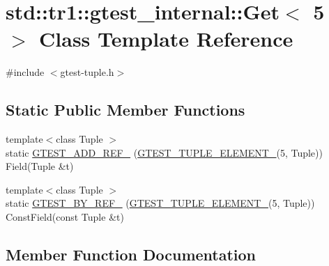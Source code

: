 \hypertarget{classstd_1_1tr1_1_1gtest__internal_1_1_get_3_015_01_4}{}\section{std\+:\+:tr1\+:\+:gtest\+\_\+internal\+:\+:Get$<$ 5 $>$ Class Template Reference}
\label{classstd_1_1tr1_1_1gtest__internal_1_1_get_3_015_01_4}


{\ttfamily \#include $<$gtest-\/tuple.\+h$>$}

\subsection*{Static Public Member Functions}
\begin{DoxyCompactItemize}
\item 
{\footnotesize template$<$class Tuple $>$ }\\static \hyperlink{classstd_1_1tr1_1_1gtest__internal_1_1_get_3_015_01_4_a0a337088bab3f824f67d1607229fdcc2}{G\+T\+E\+S\+T\+\_\+\+A\+D\+D\+\_\+\+R\+E\+F\+\_\+} (\hyperlink{gtest-tuple_8h_a1b7f133d8aa02e0b7afed7b66781eeb7}{G\+T\+E\+S\+T\+\_\+\+T\+U\+P\+L\+E\+\_\+\+E\+L\+E\+M\+E\+N\+T\+\_\+}(5, Tuple)) Field(Tuple \&t)
\item 
{\footnotesize template$<$class Tuple $>$ }\\static \hyperlink{classstd_1_1tr1_1_1gtest__internal_1_1_get_3_015_01_4_ae10fe16450db82d69b9a4d0b149ca75d}{G\+T\+E\+S\+T\+\_\+\+B\+Y\+\_\+\+R\+E\+F\+\_\+} (\hyperlink{gtest-tuple_8h_a1b7f133d8aa02e0b7afed7b66781eeb7}{G\+T\+E\+S\+T\+\_\+\+T\+U\+P\+L\+E\+\_\+\+E\+L\+E\+M\+E\+N\+T\+\_\+}(5, Tuple)) Const\+Field(const Tuple \&t)
\end{DoxyCompactItemize}


\subsection{Member Function Documentation}
\mbox{\label{classstd_1_1tr1_1_1gtest__internal_1_1_get_3_015_01_4_a0a337088bab3f824f67d1607229fdcc2}} 

